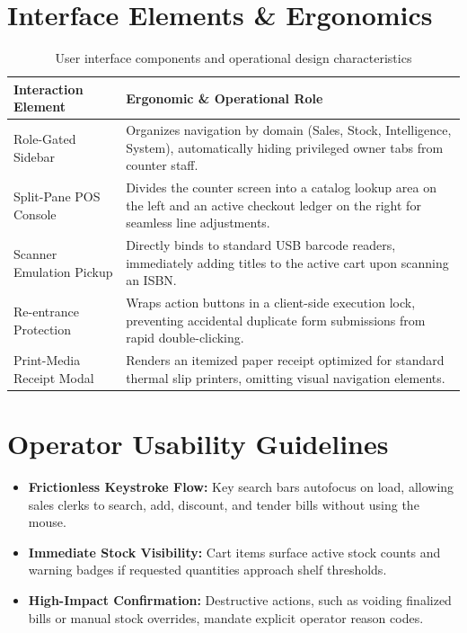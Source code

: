 \documentclass[12pt, a4paper]{report}
\begin{document}
\section{Interface Elements \& Ergonomics}
\begin{table}[H]
\centering
\footnotesize
\begin{tabularx}{\textwidth}{L{3.8cm} L{11.4cm}}
\toprule
\textbf{Interaction Element} & \textbf{Ergonomic \& Operational Role} \\
\midrule
Role-Gated Sidebar & Organizes navigation by domain (Sales, Stock, Intelligence, System), automatically hiding privileged owner tabs from counter staff. \\
Split-Pane POS Console & Divides the counter screen into a catalog lookup area on the left and an active checkout ledger on the right for seamless line adjustments. \\
Scanner Emulation Pickup & Directly binds to standard USB barcode readers, immediately adding titles to the active cart upon scanning an ISBN. \\
Re-entrance Protection & Wraps action buttons in a client-side execution lock, preventing accidental duplicate form submissions from rapid double-clicking. \\
Print-Media Receipt Modal & Renders an itemized paper receipt optimized for standard thermal slip printers, omitting visual navigation elements. \\
\bottomrule
\end{tabularx}
\caption{User interface components and operational design characteristics}
\label{tab:ui_elements}
\end{table}

\section{Operator Usability Guidelines}
\begin{itemize}[leftmargin=1.5em]
  \item \textbf{Frictionless Keystroke Flow:} Key search bars autofocus on load, allowing sales clerks to search, add, discount, and tender bills without using the mouse.
  \item \textbf{Immediate Stock Visibility:} Cart items surface active stock counts and warning badges if requested quantities approach shelf thresholds.
  \item \textbf{High-Impact Confirmation:} Destructive actions, such as voiding finalized bills or manual stock overrides, mandate explicit operator reason codes.
\end{itemize}
\end{document}
